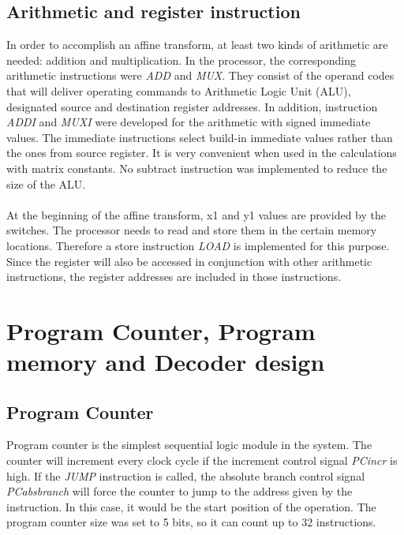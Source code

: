 \subsection{Arithmetic and register instruction} \label{SubSection:Arithmetic and register instruction}
In order to accomplish an affine transform, at least two kinds of arithmetic are needed: addition and multiplication. In the processor, the corresponding arithmetic instructions were \textit{ADD} and \textit{MUX}. They consist of the operand codes that will deliver operating commands to Arithmetic Logic Unit (ALU), designated source and destination register addresses. In addition, instruction \textit{ADDI} and \textit{MUXI} were developed for the arithmetic with signed immediate values. The immediate instructions select build-in immediate values rather than the ones from source register. It is very convenient when used in the calculations with matrix constants. No subtract instruction was implemented to reduce the size of the ALU.\\\\
At the beginning of the affine transform, x1 and y1 values are provided by the switches. The processor needs to read and store them in the certain memory locations. Therefore a store instruction \textit{LOAD} is implemented for this purpose. Since the register will also be accessed in conjunction with other arithmetic instructions, the register addresses are included in those instructions. 
	
\section{Program Counter, Program memory and Decoder design} 

\subsection{Program Counter} \label{Program Counter}
Program counter is the simplest sequential logic module in the system. The counter will increment every clock cycle if the increment control signal \textit{PCincr} is high. If the \textit{JUMP} instruction is called, the absolute branch control signal \textit{PCabsbranch} will force the counter to jump to the address given by the instruction. In this case, it would be the start position of the operation. The program counter size was set to 5 bits, so it can count up to 32 instructions. 

